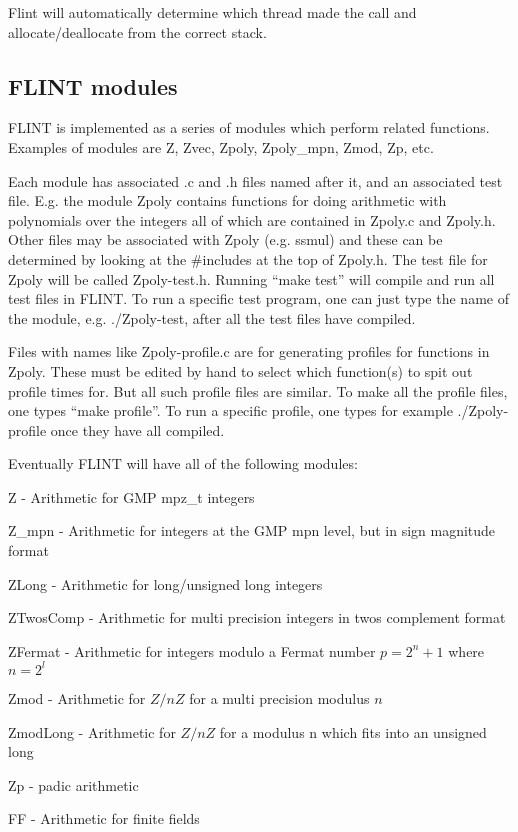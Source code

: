\documentclass[a4paper,10pt]{article}
\begin{document}
Flint will automatically determine which thread made the call and allocate/deallocate from the correct stack.

\subsection{FLINT modules}
FLINT is implemented as a series of modules which perform related functions. Examples of modules are Z, Zvec, Zpoly, Zpoly\_mpn, Zmod, Zp, etc.

Each module has associated .c and .h files named after it, and an associated test file. E.g. the module Zpoly contains functions for doing arithmetic with polynomials over the integers all of which are contained in Zpoly.c and Zpoly.h. Other files may be associated with Zpoly (e.g. ssmul) and these can be determined by looking at the \#includes at the top of Zpoly.h. The test file for Zpoly will be called Zpoly-test.h. Running ``make test'' will compile and run all test files in FLINT. To run a specific test program, one can just type the name of the module, e.g. ./Zpoly-test, after all the test files have compiled. 

Files with names like Zpoly-profile.c are for generating profiles for functions in Zpoly. These must be edited by hand to select which function(s) to spit out profile times for. But all such profile files are similar. To make all the profile files, one types ``make profile''. To run a specific profile, one types for example ./Zpoly-profile once they have all compiled.

Eventually FLINT will have all of the following modules:

Z - Arithmetic for GMP mpz\_t integers

Z\_mpn - Arithmetic for integers at the GMP mpn level, but in sign magnitude format

ZLong - Arithmetic for long/unsigned long integers

ZTwosComp - Arithmetic for multi precision integers in twos complement format

ZFermat - Arithmetic for integers modulo a Fermat number $p = 2^n+1$ where $n = 2^l$

Zmod - Arithmetic for $Z/nZ$ for a multi precision modulus $n$

ZmodLong - Arithmetic for $Z/nZ$ for a modulus n which fits into an unsigned long

Zp - padic arithmetic

FF - Arithmetic for finite fields 
\end{document}
